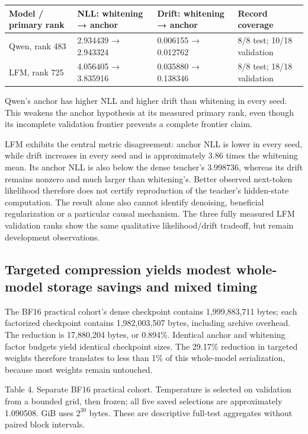 \documentclass[10pt]{article}
\begin{document}
{\scriptsize\setlength{\tabcolsep}{2pt}
\begin{longtable}{p{}p{}p{}p{}}
Model / primary rank & NLL: whitening → anchor & Drift: whitening → anchor & Record coverage \\
\hline\endhead
Qwen, rank 483 & 2.934439 → 2.943324 & 0.006155 → 0.012762 & 8/8 test; 10/18 validation \\
LFM, rank 725 & 4.056405 → 3.835916 & 0.035880 → 0.138346 & 8/8 test; 18/18 validation \\
\end{longtable}}

Qwen's anchor has higher NLL and higher drift than whitening in every seed. This weakens the anchor hypothesis at its measured primary rank, even though its incomplete validation frontier prevents a complete frontier claim.

LFM exhibits the central metric disagreement: anchor NLL is lower in every seed, while drift increases in every seed and is approximately 3.86 times the whitening mean. Its anchor NLL is also below the dense teacher's 3.998736, whereas its drift remains nonzero and much larger than whitening's. Better observed next-token likelihood therefore does not certify reproduction of the teacher's hidden-state computation. The result alone also cannot identify denoising, beneficial regularization or a particular causal mechanism. The three fully measured LFM validation ranks show the same qualitative likelihood/drift tradeoff, but remain development observations.

\subsection{Targeted compression yields modest whole-model storage savings and mixed timing}

The BF16 practical cohort's dense checkpoint contains 1,999,883,711 bytes; each factorized checkpoint contains 1,982,003,507 bytes, including archive overhead. The reduction is 17,880,204 bytes, or 0.894\%. Identical anchor and whitening factor budgets yield identical checkpoint sizes. The 29.17\% reduction in targeted weights therefore translates to less than 1\% of this whole-model serialization, because most weights remain untouched.

Table 4. Separate BF16 practical cohort. Temperature is selected on validation from a bounded grid, then frozen; all five saved selections are approximately 1.090508. GiB uses $2^{30}$ bytes. These are descriptive full-test aggregates without paired block intervals.
\end{document}
